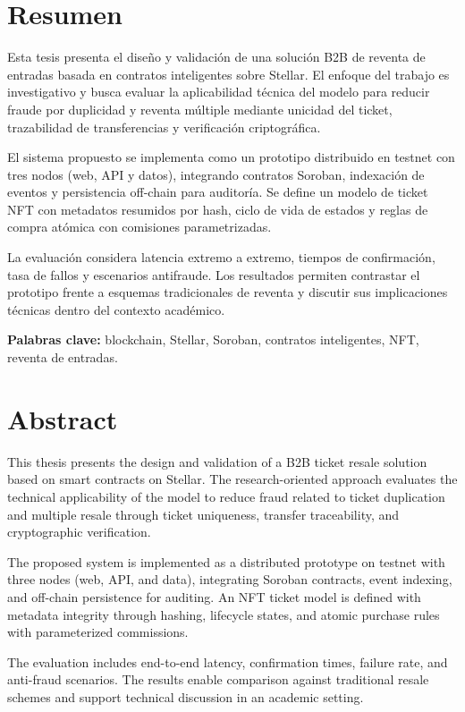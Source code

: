 \newpage
\section{Resumen}

Esta tesis presenta el diseño y validación de una solución B2B de reventa de entradas basada en contratos inteligentes sobre Stellar. El enfoque del trabajo es investigativo y busca evaluar la aplicabilidad técnica del modelo para reducir fraude por duplicidad y reventa múltiple mediante unicidad del ticket, trazabilidad de transferencias y verificación criptográfica.

El sistema propuesto se implementa como un prototipo distribuido en testnet con tres nodos (web, API y datos), integrando contratos Soroban, indexación de eventos y persistencia off-chain para auditoría. Se define un modelo de ticket NFT con metadatos resumidos por hash, ciclo de vida de estados y reglas de compra atómica con comisiones parametrizadas.

La evaluación considera latencia extremo a extremo, tiempos de confirmación, tasa de fallos y escenarios antifraude. Los resultados permiten contrastar el prototipo frente a esquemas tradicionales de reventa y discutir sus implicaciones técnicas dentro del contexto académico.

\textbf{Palabras clave:} blockchain, Stellar, Soroban, contratos inteligentes, NFT, reventa de entradas.

\newpage
\section{Abstract}

This thesis presents the design and validation of a B2B ticket resale solution based on smart contracts on Stellar. The research-oriented approach evaluates the technical applicability of the model to reduce fraud related to ticket duplication and multiple resale through ticket uniqueness, transfer traceability, and cryptographic verification.

The proposed system is implemented as a distributed prototype on testnet with three nodes (web, API, and data), integrating Soroban contracts, event indexing, and off-chain persistence for auditing. An NFT ticket model is defined with metadata integrity through hashing, lifecycle states, and atomic purchase rules with parameterized commissions.

The evaluation includes end-to-end latency, confirmation times, failure rate, and anti-fraud scenarios. The results enable comparison against traditional resale schemes and support technical discussion in an academic setting.

